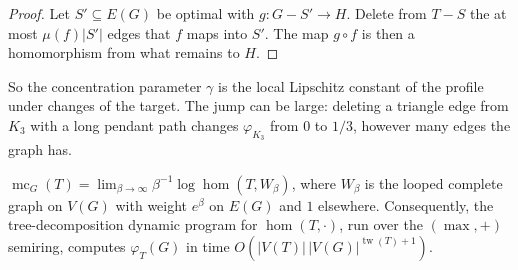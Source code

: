 \begin{proof}
Let $S'\subseteq E(G)$ be optimal with $g\colon G-S'\to H$.  Delete from
$T-S$ the at most $\mu(f)|S'|$ edges that $f$ maps into $S'$.  The map
$g\circ f$ is then a homomorphism from what remains to $H$.
\end{proof}

So the concentration parameter $\gamma$ is the local Lipschitz constant of
the profile under changes of the target.  The jump can be large:
deleting a triangle edge from $K_3$ with a long pendant path changes
$\varphi_{K_3}$ from $0$ to $1/3$, however many edges the graph has.

\begin{remark}[Computation]
$\operatorname{mc}_G(T)=\lim_{\beta\to\infty}\beta^{-1}\log\hom(T,W_\beta)$,
where $W_\beta$ is the looped complete graph on $V(G)$ with weight $e^\beta$
on $E(G)$ and $1$ elsewhere.  Consequently, the tree-decomposition dynamic
program for $\hom(T,\cdot)$, run over the $(\max,+)$ semiring, computes
$\varphi_T(G)$ in time $O(|V(T)|\,|V(G)|^{\operatorname{tw}(T)+1})$.
\end{remark}


